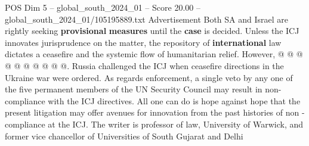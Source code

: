 \begin{textsample}{POS Dim 5 – global\_south\_2024\_01 – Score 20.00 – global\_south\_2024\_01/105195889.txt}
Advertisement Both SA and Israel are rightly seeking \textbf{provisional} \textbf{measures} until the \textbf{case} is decided.
Unless the ICJ innovates jurisprudence on the matter, the repository of \textbf{international} law dictates a ceasefire and the systemic flow of humanitarian relief.
However, @ @ @ @ @ @ @ @ @ @.
Russia challenged the ICJ when ceasefire directions in the Ukraine war were ordered.
As regards enforcement, a single veto by any one of the five permanent members of the UN Security Council may result in non-compliance with the ICJ directives.
All one can do is hope against hope that the present litigation may offer avenues for innovation from the past histories of non -compliance at the ICJ.
The writer is professor of law, University of Warwick, and former vice chancellor of Universities of South Gujarat and Delhi

\end{textsample}
